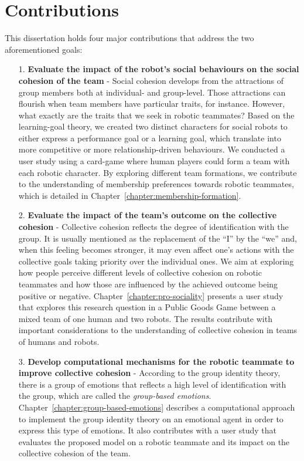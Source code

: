 \section{Contributions}
This dissertation holds four major contributions that address the two aforementioned goals:

\begin{itemize}
    \item[1.] \textbf{Evaluate the impact of the robot's social behaviours on the social cohesion of the team} - Social cohesion develops from the attractions of group members both at individual- and group-level. Those attractions can flourish when team members have particular traits, for instance. However, what exactly are the traits that we seek in robotic teammates? Based on the learning-goal theory, we created two distinct characters for social robots to either express a performance goal or a learning goal, which translate into more competitive or more relationship-driven behaviours. We conducted a user study using a card-game where human players could form a team with each robotic character. By exploring different team formations, we contribute to the understanding of membership preferences towards robotic teammates, which is detailed in Chapter~\ref{chapter:membership-formation}.
    
    
    \item[2.] \textbf{Evaluate the impact of the team's outcome on the collective cohesion} - Collective cohesion reflects the degree of identification with the group. It is usually mentioned as the replacement of the ``I'' by the ``we'' and, when this feeling becomes stronger, it may even affect one's actions with the collective goals taking priority over the individual ones. We aim at exploring how people perceive different levels of collective cohesion on robotic teammates and how those are influenced by the achieved outcome being positive or negative. Chapter~\ref{chapter:pro-sociality} presents a user study that explores this research question in a Public Goods Game between a mixed team of one human and two robots. The results contribute with important considerations to the understanding of collective cohesion in teams of humans and robots.
    
    \item[3.] \textbf{Develop computational mechanisms for the robotic teammate to improve collective cohesion} - According to the group identity theory, there is a group of emotions that reflects a high level of identification with the group, which are called the \textit{group-based emotions}. Chapter~\ref{chapter:group-based-emotions} describes a computational approach to implement the group identity theory on an emotional agent in order to express this type of emotions. It also contributes with a user study that evaluates the proposed model on a robotic teammate and its impact on the collective cohesion of the team.
    

\end{itemize}
